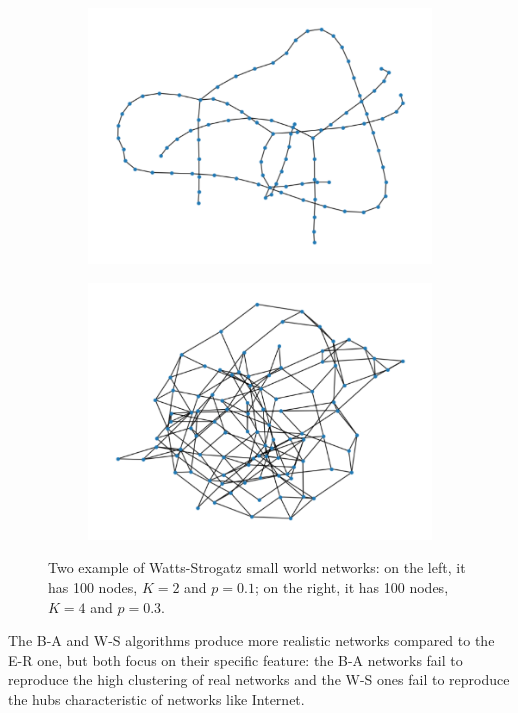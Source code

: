 \begin{figure}[ht!]
    \centering
    \begin{subfigure}[t]{0.49\textwidth}
        \centering
        \includegraphics[width=\linewidth]{image/W_S_N100_K2_p0,1.png}
    \end{subfigure}
    \hfill
    \begin{subfigure}[t]{0.49\textwidth}
        \centering
        \includegraphics[width=\linewidth]{image/W_S_N100_K4_p0,3.png}
    \end{subfigure}
    \caption{Two example of Watts-Strogatz small world networks: on the left, it has 100 nodes, $K=2$ and $p=0.1$; on the right, it has 100 nodes, $K=4$ and $p=0.3$.}
    \label{W-S_example}
\end{figure}

The B-A and W-S algorithms produce more realistic networks compared to the E-R one, but both focus on their specific feature: the B-A networks fail to reproduce the high clustering of real networks and the W-S ones fail to reproduce the hubs characteristic of networks like Internet.